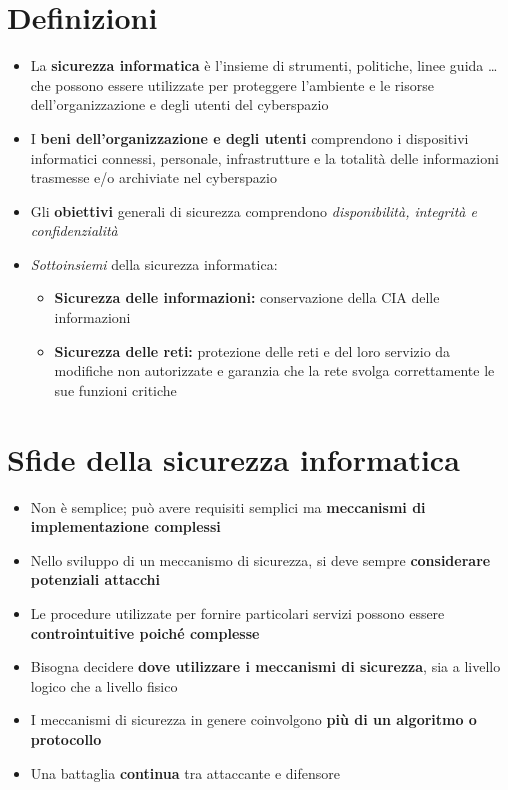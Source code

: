\section{Definizioni}
\begin{itemize}
    \item La \textbf{sicurezza informatica} è l'insieme di strumenti, politiche, linee guida \dots che 
    possono essere utilizzate per proteggere l'ambiente e le risorse dell'organizzazione e 
    degli utenti del cyberspazio 
    \item I \textbf{beni dell'organizzazione e degli utenti} comprendono i dispositivi informatici 
    connessi, personale, infrastrutture e la totalità delle informazioni trasmesse e/o 
    archiviate nel cyberspazio 
    \item Gli \textbf{obiettivi} generali di sicurezza comprendono \textit{disponibilità, integrità e 
    confidenzialità}
    \item \textit{Sottoinsiemi} della sicurezza informatica:
    \begin{itemize} 
        \item \textbf{Sicurezza delle informazioni:} conservazione della CIA delle informazioni 
        \item \textbf{Sicurezza delle reti:} protezione delle reti e del loro servizio da modifiche non 
        autorizzate e garanzia che la rete svolga correttamente le sue funzioni critiche
    \end{itemize}
\end{itemize}

\section{Sfide della sicurezza informatica}

\begin{itemize}
    \item Non è semplice; può avere requisiti semplici ma \textbf{meccanismi di implementazione complessi}
    \item Nello sviluppo di un meccanismo di sicurezza, si deve sempre \textbf{considerare 
    potenziali attacchi}
    \item Le procedure utilizzate per fornire particolari servizi possono essere \textbf{controintuitive 
    poiché complesse}
    \item Bisogna decidere \textbf{dove utilizzare i meccanismi di sicurezza}, sia a livello 
    logico che a livello fisico
    \item I meccanismi di sicurezza in genere coinvolgono \textbf{più di un algoritmo 
    o protocollo}
    \item Una battaglia \textbf{continua} tra attaccante e difensore
\end{itemize}

